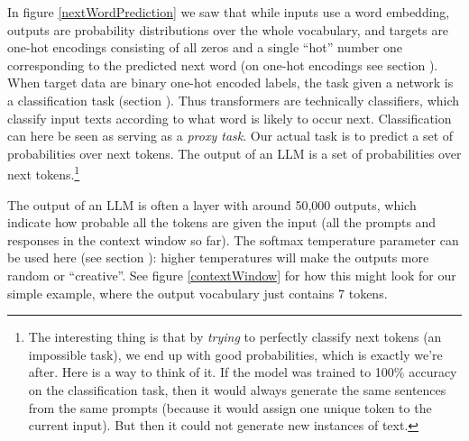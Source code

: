 In figure \ref{nextWordPrediction} we saw that while inputs use a word embedding, outputs are probability distributions over the whole vocabulary, and targets are one-hot encodings consisting of all zeros and a single ``hot'' number one corresponding to the predicted next word (on one-hot encodings see section ). When target data are binary one-hot encoded labels, the task given a network is a classification task (section ). Thus transformers are technically classifiers, which classify input texts according to what word is likely to occur next. Classification can here be seen as serving as a \emph{proxy task}. Our actual task is to predict a set of probabilities over next tokens. The output of an LLM is a set of probabilities over next tokens.\footnote{The interesting thing is that by \emph{trying} to perfectly classify next tokens (an impossible task), we end up with good probabilities, which is exactly we're after. Here is a way to think of it. If the model was trained to 100\% accuracy on the classification task, then it would always generate the same sentences from the same prompts (because it would assign one unique token to the current input). But then it could not generate new instances of text.}

The output of an LLM is often a  layer with around 50,000 outputs, which  indicate how probable all the tokens are given the input (all the prompts and responses in the context window so far). The softmax temperature parameter can be used here (see section ): higher temperatures will make the outputs more random or ``creative''. See figure \ref{contextWindow} for how this might look for our simple example, where the output vocabulary just contains 7 tokens. 

